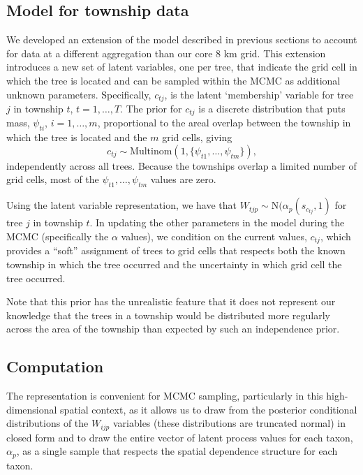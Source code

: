 \documentclass[12pt]{article}\usepackage[]{graphicx}\usepackage[]{color}
\begin{document}
\noindent 



\noindent 


\subsection{Model for township data\label{sub:Model-for-township}}

We developed an extension of the model described in previous sections
to account for data at a different aggregation than our core 8 km
grid. This extension introduces a new set of latent variables, one
per tree, that indicate the grid cell in which the tree is located
and can be sampled within the MCMC as additional unknown parameters.
Specifically, $c_{tj}$, is the latent `membership' variable for tree
$j$ in township $t$, $t=1,\ldots,T$. The prior for $c_{tj}$ is
a discrete distribution that puts mass, $\psi_{ti}$, $i=1,\ldots,m$,
proportional to the areal overlap between the township in which the
tree is located and the $m$ grid cells, giving 
\[
c_{tj}\sim\mbox{Multinom}(1,\{\psi_{t1},\ldots,\psi_{tm}\}),
\]
independently across all trees. Because the townships overlap a limited
number of grid cells, most of the $\psi_{t1},\ldots,\psi_{tm}$ values
are zero.

Using the latent variable representation, we have that $W_{tjp}\sim\mbox{N}(\alpha_{p}(s_{c_{tj}},1)$
for tree $j$ in township $t$. In updating the other parameters in
the model during the MCMC (specifically the $\alpha$ values), we
condition on the current values, $c_{tj}$, which provides a ``soft''
assignment of trees to grid cells that respects both the known township
in which the tree occurred and the uncertainty in which grid cell
the tree occurred.

Note that this prior has the unrealistic feature that it does not
represent our knowledge that the trees in a township would be distributed
more regularly across the area of the township than expected by such
an independence prior.


\subsection{Computation}

The \cite{McCu:Ross:1994} representation is convenient for MCMC sampling,
particularly in this high-dimensional spatial context, as it allows
us to draw from the posterior conditional distributions of the $W_{ijp}$
variables (these distributions are truncated normal) in closed form
and to draw the entire vector of latent process values for each taxon,
$\alpha_{p}$, as a single sample that respects the spatial dependence
structure for each taxon.
\end{document}
